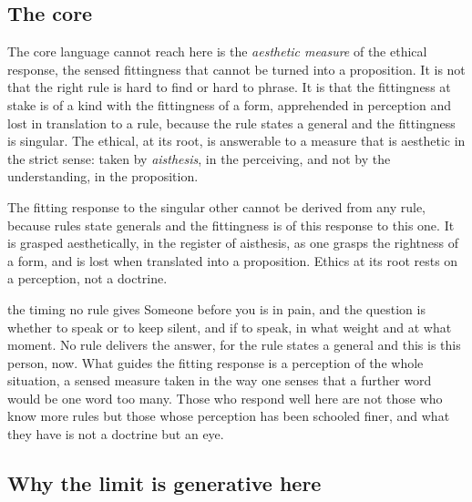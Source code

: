 \subsection*{The core}

The core language cannot reach here is the \emph{aesthetic measure} of the ethical response, the sensed fittingness that cannot be turned into a proposition. It is not that the right rule is hard to find or hard to phrase. It is that the fittingness at stake is of a kind with the fittingness of a form, apprehended in perception and lost in translation to a rule, because the rule states a general and the fittingness is singular. The ethical, at its root, is answerable to a measure that is aesthetic in the strict sense: taken by \emph{aisthesis}, in the perceiving, and not by the understanding, in the proposition.

\begin{claim}
The fitting response to the singular other cannot be derived from any rule, because rules state generals and the fittingness is of this response to this one. It is grasped aesthetically, in the register of aisthesis, as one grasps the rightness of a form, and is lost when translated into a proposition. Ethics at its root rests on a perception, not a doctrine.
\end{claim}

\begin{casebox}{the timing no rule gives}
Someone before you is in pain, and the question is whether to speak or to keep silent, and if to speak, in what weight and at what moment. No rule delivers the answer, for the rule states a general and this is this person, now. What guides the fitting response is a perception of the whole situation, a sensed measure taken in the way one senses that a further word would be one word too many. Those who respond well here are not those who know more rules but those whose perception has been schooled finer, and what they have is not a doctrine but an eye.
\end{casebox}

\subsection*{Why the limit is generative here}

